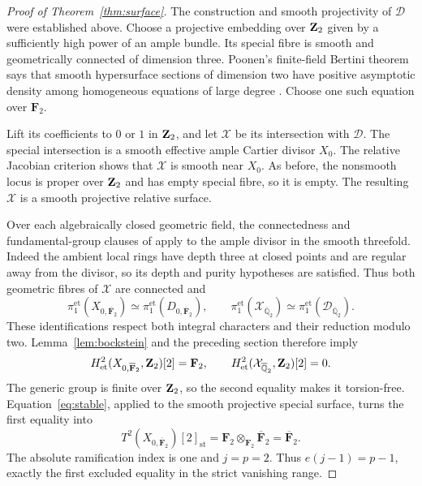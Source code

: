 \documentclass[11pt]{article}
\newcommand{\FF}{\mathbf F}\newcommand{\PP}{\mathbf P}
\newcommand{\et}{\mathrm{et}}\newcommand{\crys}{\mathrm{crys}}
\newcommand{\st}{\mathrm{st}}\newcommand{\tors}{\mathrm{tors}}
\theoremstyle{definition}\newtheorem{definition}[theorem]{Definition}
\theoremstyle{remark}\newtheorem{remark}[theorem]{Remark}
\begin{document}
\begin{proof}[Proof of Theorem~\ref{thm:surface}]
The construction and smooth projectivity of $\mathcal D$ were established above. Choose a projective embedding over $\mathbf Z_2$ given by a sufficiently high power of an ample bundle. Its special fibre is smooth and geometrically connected of dimension three. Poonen's finite-field Bertini theorem says that smooth hypersurface sections of dimension two have positive asymptotic density among homogeneous equations of large degree \citep[Theorem~1.1 and its proof in \S2.4, author-version pp.~2 and~7]{Poonen}. Choose one such equation over $\FF_2$.

Lift its coefficients to $0$ or $1$ in $\mathbf Z_2$, and let $\mathcal X$ be its intersection with $\mathcal D$. The special intersection is a smooth effective ample Cartier divisor $X_0$. The relative Jacobian criterion shows that $\mathcal X$ is smooth near $X_0$. As before, the nonsmooth locus is proper over $\mathbf Z_2$ and has empty special fibre, so it is empty. The resulting $\mathcal X$ is a smooth projective relative surface.

Over each algebraically closed geometric field, the connectedness and fundamental-group clauses of \citet[Expos\'e~XII, Corollary~3.5]{SGA2} apply to the ample divisor in the smooth threefold. Indeed the ambient local rings have depth three at closed points and are regular away from the divisor, so its depth and purity hypotheses are satisfied. Thus both geometric fibres of $\mathcal X$ are connected and
\[
 \pi_1^{\et}(X_{0,\overline{\FF}_2})
    \simeq\pi_1^{\et}(D_{0,\overline{\FF}_2}),
 \qquad
 \pi_1^{\et}(\mathcal X_{\overline{\mathbb Q}_2})
    \simeq\pi_1^{\et}(\mathcal D_{\overline{\mathbb Q}_2}).
\]
These identifications respect both integral characters and their reduction modulo two. Lemma~\ref{lem:bockstein} and the preceding section therefore imply
\[
 H^2_{\et}(X_{0,\overline{\FF}_2},\ZZ_2)[2]=\FF_2,
 \qquad
 H^2_{\et}(\mathcal X_{\overline{\mathbb Q}_2},\ZZ_2)[2]=0.
\]
The generic group is finite over $\mathbf Z_2$, so the second equality makes it torsion-free. Equation~\eqref{eq:stable}, applied to the smooth projective special surface, turns the first equality into
\[
 T^2(X_{0,\overline{\FF}_2})[2]_{\st}
      =\FF_2\otimes_{\FF_2}\overline{\FF}_2
      =\overline{\FF}_2.
\]
The absolute ramification index is one and $j=p=2$. Thus $e(j-1)=p-1$, exactly the first excluded equality in the strict vanishing range.
\end{proof}
\end{document}
